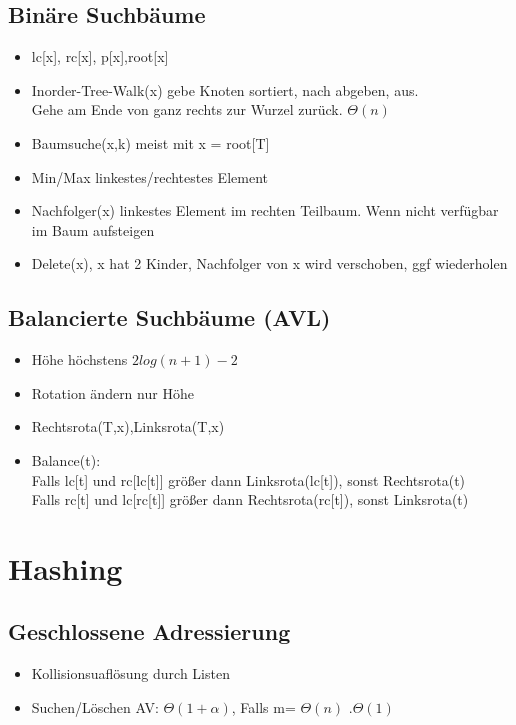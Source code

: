 \documentclass{article}
\begin{document}
\subsection{Bin{\"a}re Suchb{\"a}ume}
\begin{itemize}
\item lc[x], rc[x], p[x],root[x]
\item Inorder-Tree-Walk(x) gebe Knoten sortiert, nach abgeben, aus. \\ Gehe am Ende von ganz rechts zur Wurzel zur{\"u}ck. $\Theta(n)$
\item Baumsuche(x,k) meist mit x = root[T]
\item Min/Max linkestes/rechtestes Element
\item Nachfolger(x) linkestes Element im rechten Teilbaum. Wenn nicht verf{\"u}gbar im Baum aufsteigen
\item Delete(x), x hat 2 Kinder, Nachfolger von x wird verschoben, ggf wiederholen
\end{itemize}

\subsection{Balancierte Suchb{\"a}ume (AVL)}
\begin{itemize}
\item H{\"o}he h{\"o}chstens $2log(n+1)-2$
\item Rotation {\"a}ndern nur H{\"o}he
\item Rechtsrota(T,x),Linksrota(T,x)
\item Balance(t): \\Falls lc[t] und rc[lc[t]] gr{\"o}\ss er dann Linksrota(lc[t]), sonst Rechtsrota(t) \\
	Falls rc[t] und lc[rc[t]] gr{\"o}\ss er dann Rechtsrota(rc[t]), sonst Linksrota(t)
\end{itemize}

\section{Hashing}
\subsection{Geschlossene Adressierung}
\begin{itemize}
\item Kollisionsuafl{\"o}sung durch Listen
\item Suchen/L{\"o}schen AV: $\Theta(1+\alpha)$, Falls  m= $\Theta(n)$ $.\Theta(1)$
\end{itemize}
\end{document}
